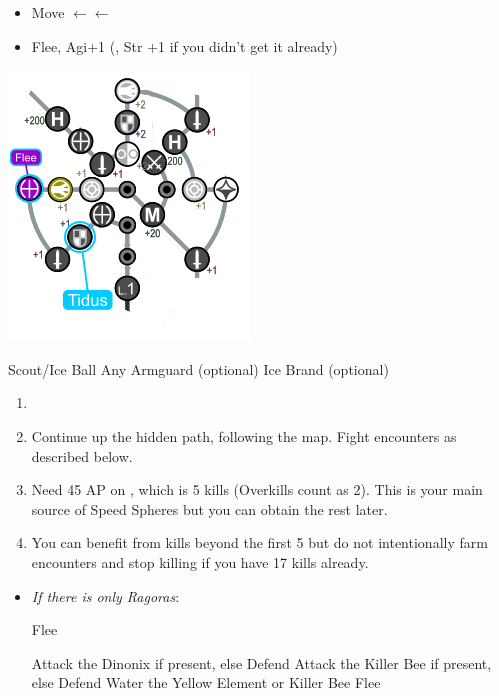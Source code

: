 \begin{spheregrid}
    \begin{itemize}
        \tidusf
        \begin{itemize}
            \item Move $\leftarrow\leftarrow$
            \item Flee, Agi+1 (, Str +1 if you didn't get it already)
        \end{itemize}
    \end{itemize}
    \includegraphics{graphics/Tidus_Kilika}
\end{spheregrid}
\begin{equip}
    \begin{itemize}
        \wakkaf Scout/Ice Ball
        \wakkaf Any Armguard (optional)
        \tidusf Ice Brand (optional)
    \end{itemize}
\end{equip}
\begin{enumerate}[resume]
    \item \formation{\tidus}{\wakka}{\lulu}
    \item Continue up the hidden path, following the map. Fight encounters as described below.
    \item Need 45 AP on \tidus, which is 5 kills (Overkills count as 2). This is your main source of Speed Spheres but you can obtain the rest later.
    \item You can benefit from kills beyond the first 5 but do not intentionally farm encounters and stop killing if you have 17 kills already.
\end{enumerate}
\begin{encounters}
    \begin{itemize}
        \item \textit{If there is only Ragoras}:
        \begin{itemize}
            \tidusf Flee
        \end{itemize}
        \tidusf Attack the Dinonix if present, else Defend
        \wakkaf Attack the Killer Bee if present, else Defend
        \luluf Water the Yellow Element or Killer Bee
        \tidusf Flee
    \end{itemize}
\end{encounters}
